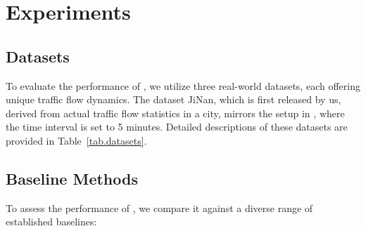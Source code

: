 \section{Experiments}


\subsection{Datasets}


To evaluate the performance of \model, we utilize three real-world datasets, each offering unique traffic flow dynamics. The dataset JiNan, which is first released by us, derived from actual traffic flow statistics in a city, mirrors the setup in \cite{song2020STSGCNaaai}, where the time interval is set to 5 minutes. 
Detailed descriptions of these datasets are provided in Table~\ref{tab.datasets}.



\subsection{Baseline Methods}

To assess the performance of \model, we compare it against a diverse range of established baselines:

